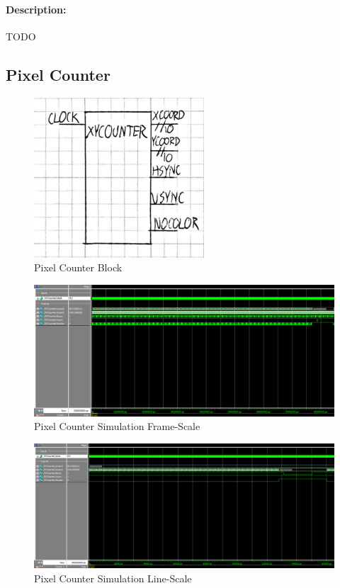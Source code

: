 \documentclass[]{article}
\begin{document}
\paragraph{Description:} TODO

\subsection{Pixel Counter}
\begin{figure}[H]\centering
    \includegraphics[width=0.5\linewidth]{figures/XYCounter_Block.png}
    \caption{Pixel Counter Block}
    \label{fig:pixelCounterBlock}
\end{figure}
\begin{figure}[H]\centering
    \includegraphics[width=\linewidth]{figures/XYCounter_Sim_Frame.png}
    \caption{Pixel Counter Simulation Frame-Scale}
    \label{fig:pixelCounterSimFrame}
\end{figure}
\begin{figure}[H]\centering
    \includegraphics[width=\linewidth]{figures/XYCounter_Sim_Line.png}
    \caption{Pixel Counter Simulation Line-Scale}
    \label{fig:pixelCounterSimLine}
\end{figure}
\end{document}
